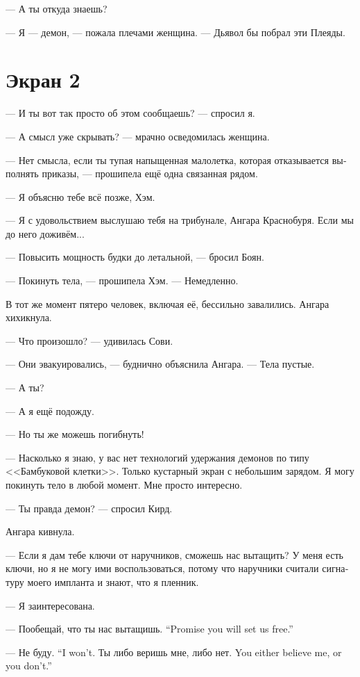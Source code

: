 \documentclass[a4paper,12pt,fleqn]{book}\usepackage{polyglossia}\setdefaultlanguage[babelshorthands=true]{russian}\setotherlanguage{english}\defaultfontfeatures{Ligatures=TeX,Mapping=tex-text}
\begin{document}
--- А ты откуда знаешь?

--- Я --- демон, --- пожала плечами женщина.
--- Дьявол бы побрал эти Плеяды.

\section{Экран 2}

--- И ты вот так просто об этом сообщаешь? --- спросил я.

--- А смысл уже скрывать? --- мрачно осведомилась женщина.

--- Нет смысла, если ты тупая напыщенная малолетка, которая отказывается выполнять приказы, --- прошипела ещё одна связанная рядом.

--- Я объясню тебе всё позже, Хэм.

--- Я с удовольствием выслушаю тебя на трибунале, Ангара Краснобуря.
Если мы до него доживём...

--- Повысить мощность будки до летальной, --- бросил Боян.

--- Покинуть тела, --- прошипела Хэм.
--- Немедленно.

В тот же момент пятеро человек, включая её, бессильно завалились.
Ангара хихикнула.

--- Что произошло? --- удивилась Сови.

--- Они эвакуировались, --- буднично объяснила Ангара.
--- Тела пустые.

--- А ты?

--- А я ещё подожду.

--- Но ты же можешь погибнуть!

--- Насколько я знаю, у вас нет технологий удержания демонов по типу <<Бамбуковой клетки>>.
Только кустарный экран с небольшим зарядом.
Я могу покинуть тело в любой момент.
Мне просто интересно.

--- Ты правда демон? --- спросил Кирд.

Ангара кивнула.

--- Если я дам тебе ключи от наручников, сможешь нас вытащить?
У меня есть ключи, но я не могу ими воспользоваться, потому что наручники считали сигнатуру моего импланта и знают, что я пленник.

--- Я заинтересована.

{--- Пообещай, что ты нас вытащишь.}
{``Promise you will set us free.''}

{--- Не буду.}
{``I won't.}
{Ты либо веришь мне, либо нет.}
{You either believe me, or you don't.''}
\end{document}
